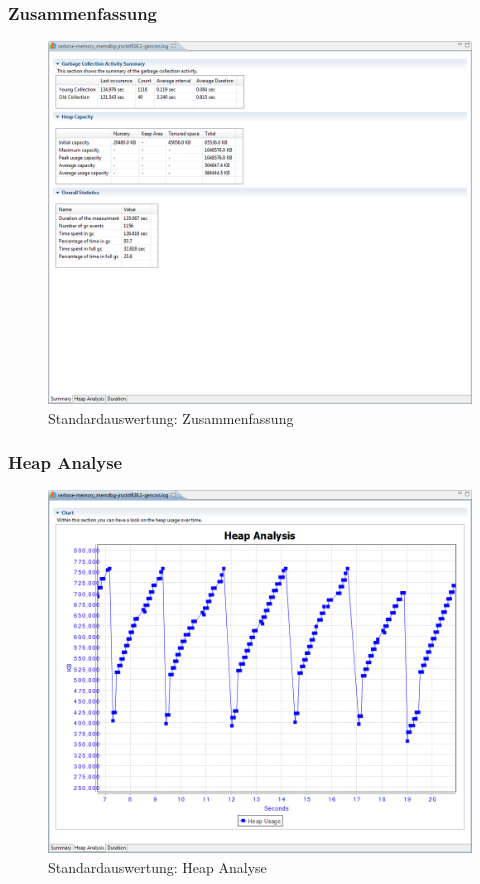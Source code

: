\subsubsection*{Zusammenfassung}
 \begin{figure}[H]
  	\centering
    	\includegraphics[width=15cm]{images/tutorial_standardreport_statistics}
        	\caption{Standardauswertung: Zusammenfassung}
\end{figure}

\subsubsection*{Heap Analyse}
 \begin{figure}[H]
  	\centering
    	\includegraphics[width=15cm]{images/tutorial_standardreport_heapanalysis}
        	\caption{Standardauswertung: Heap Analyse}
\end{figure}

